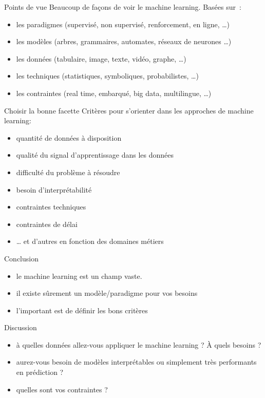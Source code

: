 \begin{frame}{Points de vue}
  Beaucoup de façons de voir le machine learning. Basées sur~:
  \begin{itemize}[<+->]
    \item les paradigmes (supervisé, non supervisé, renforcement, en
      ligne, …)
    \item les modèles (arbres, grammaires, automates, réseaux de
      neurones …)
    \item les données (tabulaire, image, texte, vidéo, graphe, …)
    \item les techniques (statistiques, symboliques, probabilistes, …)
    \item les contraintes (real time, embarqué, big data, multilingue,
      …)
  \end{itemize}

\end{frame}

\begin{frame}{Choisir la bonne facette}
  Critères pour s'orienter dans les approches de machine learning:
  \begin{itemize}[<+->]
  \item quantité de données à disposition
  \item qualité du signal d'apprentissage dans les données
  \item difficulté du problème à résoudre
  \item besoin d'interprétabilité
  \item contraintes techniques
  \item contraintes de délai
  \item … et d'autres en fonction des domaines métiers
  \end{itemize}
\end{frame}

\begin{frame}{Conclusion}
  \begin{itemize}
  \item le machine learning est un champ vaste.
  \item il existe sûrement un modèle/paradigme pour vos besoins
  \item l'important est de définir les bons critères
  \end{itemize}
\end{frame}

\begin{frame}{Discussion}
  \begin{itemize}
  \item à quelles données allez-vous appliquer le machine learning ? À
    quels besoins ?
  \item aurez-vous besoin de modèles interprétables ou simplement très
    performants en prédiction ?
  \item quelles sont vos contraintes ?
  \end{itemize}
\end{frame}
